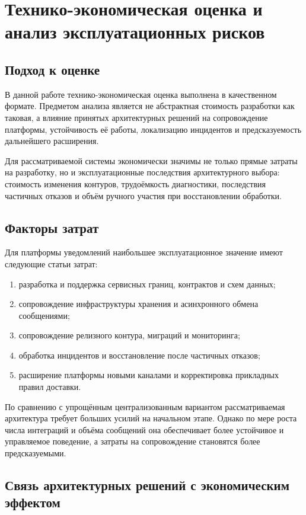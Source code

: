 \section{Технико-экономическая оценка и анализ эксплуатационных рисков}

\subsection{Подход к оценке}

В данной работе технико-экономическая оценка выполнена в качественном формате.
Предметом анализа является не абстрактная стоимость разработки как таковая, а влияние
принятых архитектурных решений на сопровождение платформы, устойчивость её работы,
локализацию инцидентов и предсказуемость дальнейшего расширения.

Для рассматриваемой системы экономически значимы не только прямые затраты на разработку,
но и эксплуатационные последствия архитектурного выбора: стоимость изменения контуров,
трудоёмкость диагностики, последствия частичных отказов и объём ручного участия при
восстановлении обработки.

\subsection{Факторы затрат}

Для платформы уведомлений наибольшее эксплуатационное значение имеют следующие статьи затрат:
\begin{enumerate}
    \item разработка и поддержка сервисных границ, контрактов и схем данных;
    \item сопровождение инфраструктуры хранения и асинхронного обмена сообщениями;
    \item сопровождение релизного контура, миграций и мониторинга;
    \item обработка инцидентов и восстановление после частичных отказов;
    \item расширение платформы новыми каналами и корректировка прикладных правил доставки.
\end{enumerate}

По сравнению с упрощённым централизованным вариантом рассматриваемая архитектура требует
больших усилий на начальном этапе. Однако по мере роста числа интеграций и объёма сообщений
она обеспечивает более устойчивое и управляемое поведение, а затраты на сопровождение
становятся более предсказуемыми.

\subsection{Связь архитектурных решений с экономическим эффектом}

